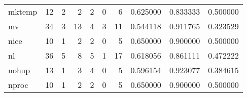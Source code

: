\begin{tabular}{lrrrrrrrrr}
mktemp    &                                      12 &                                                  2 &                                                  2 &                                                  2 &                                                  0 &                                                  6 &                                           0.625000 &                               0.833333 &                             0.500000 \\
mv        &                                      34 &                                                  3 &                                                 13 &                                                  4 &                                                  3 &                                                 11 &                                           0.544118 &                               0.911765 &                             0.323529 \\
nice      &                                      10 &                                                  1 &                                                  2 &                                                  2 &                                                  0 &                                                  5 &                                           0.650000 &                               0.900000 &                             0.500000 \\
nl        &                                      36 &                                                  5 &                                                  8 &                                                  5 &                                                  1 &                                                 17 &                                           0.618056 &                               0.861111 &                             0.472222 \\
nohup     &                                      13 &                                                  1 &                                                  3 &                                                  4 &                                                  0 &                                                  5 &                                           0.596154 &                               0.923077 &                             0.384615 \\
nproc     &                                      10 &                                                  1 &                                                  2 &                                                  2 &                                                  0 &                                                  5 &                                           0.650000 &                               0.900000 &                             0.500000 \\

\end{tabular}
